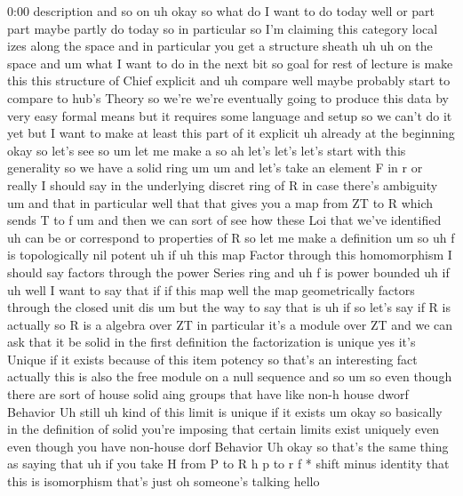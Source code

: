 \begin{unfinished}{0:00}
description  and  so
on  uh  okay  so  what  do  I  want  to  do  today
well  or  part  part  maybe  partly  do  today
so  in  particular  so  I'm  claiming  this
category  local  izes  along  the  space  and
in  particular  you  get  a  structure
sheath
uh  uh  on  the
space  and  um  what  I  want  to  do  in  the
next  bit  so  goal  for  rest  of
lecture
is  make
this  this  structure  of  Chief
explicit  and  uh  compare  well  maybe
probably  start  to  compare  to  hub's
Theory  so  we're  we're  eventually  going
to  produce  this  data  by
very  easy  formal  means  but  it  requires
some  language  and  setup  so  we  can't  do
it  yet  but  I  want  to  make  at  least  this
part  of  it  explicit  uh  already  at  the
beginning  okay
so  let's
see  so  um  let  me  make  a  so  ah  let's
let's  let's  start  with  this  generality
so  we  have  a  solid
ring
um  um  and  let's  take  an  element  F  in  r
or  really  I  should  say  in  the  underlying
discret  ring  of  R  in  case  there's
ambiguity  um  and  that  in  particular  well
that  that  gives  you  a  map  from  ZT  to  R
which  sends  T  to  f
um  and  then  we  can  sort  of  see  how  these
Loi  that  we've  identified  uh  can  be  or
correspond  to  properties  of  R  so  let  me
make  a
definition  um
so  uh  f  is  topologically  nil
potent  uh
if  uh  this  map  Factor
through  this  homomorphism  I  should  say
factors  through  the  power  Series
ring  and  uh  f  is  power
bounded  uh  if  uh  well  I  want  to  say  that
if  if  this  map  well  the  map
geometrically  factors  through  the  closed
unit  dis  um  but  the  way  to  say  that  is
uh  if  so  let's  say  if  R  is  actually  so  R
is  a  algebra  over  ZT  in  particular  it's
a  module  over  ZT  and  we  can  ask  that  it
be
solid  in  the  first  definition  the
factorization  is  unique  yes  it's  Unique
if  it  exists  because  of  this  item
potency  so  that's  an  interesting  fact
actually  this  is  also  the  free  module  on
a  null  sequence  and  so
um  so  even  though  there  are  sort  of
house  solid  aing  groups  that  have  like
non-h  house  dworf  Behavior  Uh  still  uh
kind  of  this  limit  is  unique  if  it
exists
um
okay  so  basically  in  the  definition  of
solid  you're  imposing  that  certain
limits  exist  uniquely  even  even  though
you  have  non-house  dorf
Behavior  Uh  okay  so  that's  the  same
thing  as  saying  that  uh  if  you  take  H
from  P  to  R
h  p  to  r  f  *  shift  minus  identity  that
this  is  isomorphism  that's
just  oh  someone's  talking  hello

\end{unfinished}
